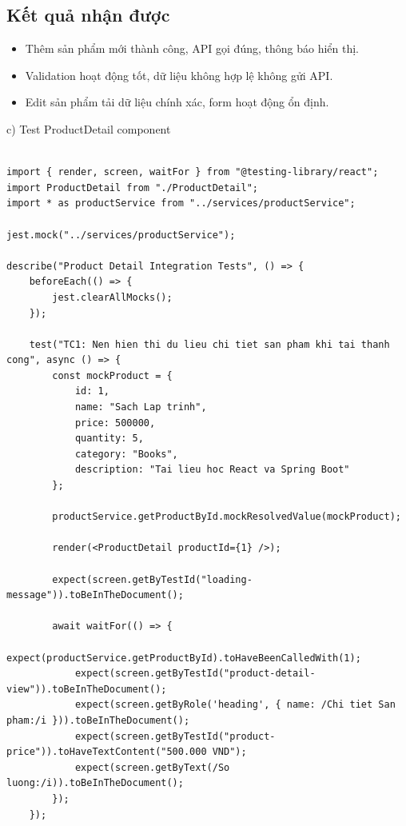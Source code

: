 \documentclass[a4paper,12pt]{article}
\begin{document}
\subsection*{Kết quả nhận được}
\begin{itemize}
    \item Thêm sản phẩm mới thành công, API gọi đúng, thông báo hiển thị.
    \item Validation hoạt động tốt, dữ liệu không hợp lệ không gửi API.
    \item Edit sản phẩm tải dữ liệu chính xác, form hoạt động ổn định.
\end{itemize}
c) Test ProductDetail component
\begin{tcolorbox}[breakable, colback=green!5,colframe=black!50,title=Product Detail Integration Tests]
\begin{lstlisting}

import { render, screen, waitFor } from "@testing-library/react";
import ProductDetail from "./ProductDetail";
import * as productService from "../services/productService";

jest.mock("../services/productService");

describe("Product Detail Integration Tests", () => {
    beforeEach(() => {
        jest.clearAllMocks();
    });

    test("TC1: Nen hien thi du lieu chi tiet san pham khi tai thanh cong", async () => {
        const mockProduct = {
            id: 1,
            name: "Sach Lap trinh",
            price: 500000,
            quantity: 5,
            category: "Books",
            description: "Tai lieu hoc React va Spring Boot"
        };

        productService.getProductById.mockResolvedValue(mockProduct);

        render(<ProductDetail productId={1} />);

        expect(screen.getByTestId("loading-message")).toBeInTheDocument();

        await waitFor(() => {
            expect(productService.getProductById).toHaveBeenCalledWith(1);
            expect(screen.getByTestId("product-detail-view")).toBeInTheDocument();
            expect(screen.getByRole('heading', { name: /Chi tiet San pham:/i })).toBeInTheDocument();
            expect(screen.getByTestId("product-price")).toHaveTextContent("500.000 VND");
            expect(screen.getByText(/So luong:/i)).toBeInTheDocument();
        });
    });


\end{lstlisting}
\end{tcolorbox}
\end{document}
